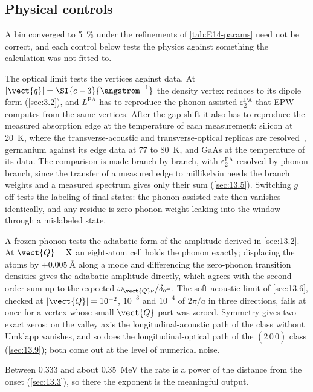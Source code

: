 \subsection{Physical controls}

A bin converged to \SI{5}{\percent} under the refinements of \cref{tab:E14-params} need not be correct, and each control below tests the physics against something the calculation was not fitted to.

The optical limit tests the vertices against data. At $|\vect{q}| = \SI{e-3}{\angstrom^{-1}}$ the density vertex reduces to its dipole form (\cref{sec:3.2}), and $L^{\mathrm{PA}}$ has to reproduce the phonon-assisted $\varepsilon_2^{\mathrm{PA}}$ that EPW computes from the same vertices. After the gap shift it also has to reproduce the measured absorption edge at the temperature of each measurement: silicon at \SI{20}{K}, where the transverse-acoustic and transverse-optical replicas are resolved~\cite{macfarlane1958fine}, germanium against its edge data at 77 to \SI{80}{K}, and GaAs at the temperature of its data. The comparison is made branch by branch, with $\varepsilon_2^{\mathrm{PA}}$ resolved by phonon branch, since the transfer of a measured edge to millikelvin needs the branch weights and a measured spectrum gives only their sum (\cref{sec:13.5}). Switching $g$ off tests the labeling of final states: the phonon-assisted rate then vanishes identically, and any residue is zero-phonon weight leaking into the window through a mislabeled state.

A frozen phonon tests the adiabatic form of the amplitude derived in \cref{sec:13.2}. At $\vect{Q} = \mathrm{X}$ an eight-atom cell holds the phonon exactly; displacing the atoms by $\pm\SI{0.005}{\angstrom}$ along a mode and differencing the zero-phonon transition densities gives the adiabatic amplitude directly, which agrees with the second-order sum up to the expected $\omega_{\vect{Q}\nu}/\delta_{\mathrm{off}}$. The soft acoustic limit of \cref{sec:13.6}, checked at $|\vect{Q}| = 10^{-2}$, $10^{-3}$ and $10^{-4}$ of $2\pi/a$ in three directions, fails at once for a vertex whose small-$\vect{Q}$ part was zeroed. Symmetry gives two exact zeros: on the valley axis the longitudinal-acoustic path of the class without Umklapp vanishes, and so does the longitudinal-optical path of the $(\bar2\,0\,0)$ class (\cref{sec:13.9}); both come out at the level of numerical noise.

Between 0.333 and about \SI{0.35}{MeV} the rate is a power of the distance from the onset (\cref{sec:13.3}), so there the exponent is the meaningful output.

